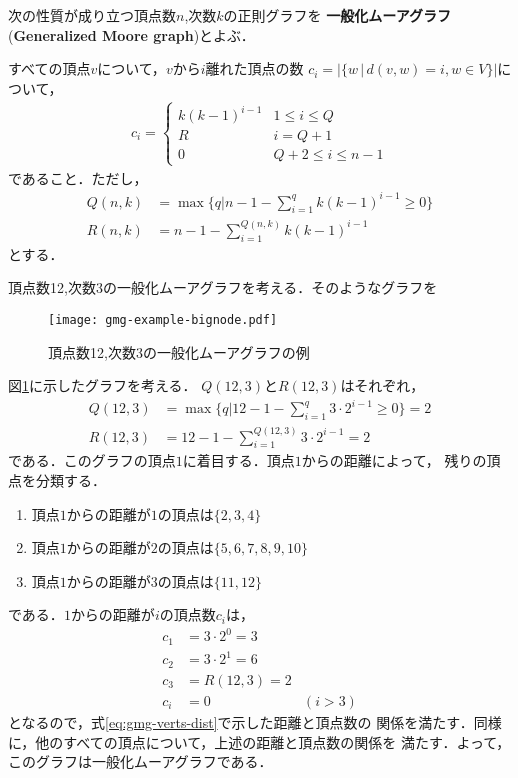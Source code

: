 \begin{definition}
  \label{def:generalized-moore-graph}
  次の性質が成り立つ頂点数$n$,次数$k$の正則グラフを
  \textbf{一般化ムーアグラフ}(\textbf{Generalized Moore graph})とよぶ．

  すべての頂点$v$について，$v$から$i$離れた頂点の数
  $c_i = \lvert\{ w\,|\,d(v,w) = i , w\in V \}\rvert$について，
  \begin{equation}
    \label{eq:gmg-verts-dist}
    \begin{aligned}
      c_i =
      \begin{cases}
        k(k-1)^{i-1} & 1\leq i\leq Q \\
        R & i = Q+1 \\
        0 & Q+2\leq i \leq n-1
      \end{cases}
    \end{aligned}
  \end{equation}
  であること．ただし，
  \begin{align}
    Q(n,k)&=\max\{q|n-1-\sum_{i=1}^{q}k(k-1)^{i-1}\geq 0\}\label{eq:gmg-q} \\
    R(n,k)&=n-1-\sum_{i=1}^{Q(n,k)}k(k-1)^{i-1}\label{eq:gmg-r}
  \end{align}
  とする．
\end{definition}
\begin{example}
  頂点数12,次数3の一般化ムーアグラフを考える．そのようなグラフを
  \begin{figure}
    \centering
    \texttt{[image: gmg-example-bignode.pdf]}
    \caption{頂点数12,次数3の一般化ムーアグラフの例}
    \label{fig:moore-graph-example}
  \end{figure}
  図\ref{fig:moore-graph-example}に示したグラフを考える．
  $Q(12,3)$と$R(12,3)$はそれぞれ，
  \begin{align*}
    Q(12,3) &= \max\{q | 12-1-\sum_{i=1}^{q}3\cdot2^{i-1} \geq 0\} = 2 \\
    R(12,3) &= 12 - 1 - \sum_{i=1}^{Q(12,3)}3\cdot2^{i-1} = 2
  \end{align*}
  である．このグラフの頂点$1$に着目する．頂点$1$からの距離によって，
  残りの頂点を分類する．
  \begin{enumerate}
  \item 頂点$1$からの距離が$1$の頂点は$\{2,3,4\}$
  \item 頂点$1$からの距離が$2$の頂点は$\{5,6,7,8,9,10\}$
  \item 頂点$1$からの距離が$3$の頂点は$\{11,12\}$
  \end{enumerate}
  である．$1$からの距離が$i$の頂点数$c_i$は，
  \begin{align*}
  c_1 &= 3\cdot2^0 = 3 & \\
  c_2 &= 3\cdot2^1 = 6 & \\
  c_3 &= R(12,3) = 2 & \\
  c_i &= 0 & (i>3)
  \end{align*}
  となるので，式\ref{eq:gmg-verts-dist}で示した距離と頂点数の
  関係を満たす．同様に，他のすべての頂点について，上述の距離と頂点数の関係を
  満たす．よって，このグラフは一般化ムーアグラフである．
\end{example}
